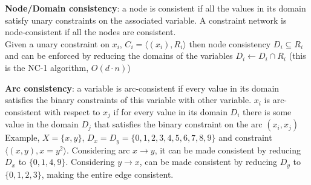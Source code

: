 \documentclass[10pt]{report}
\begin{document}
\begin{list}{}{} 
	\item \textbf{Node/Domain consistency}: a node is consistent if all the values in its domain satisfy unary constraints on the associated variable. A constraint network is node-consistent if all the nodes are consistent.\\
	Given a unary constraint on $x_i$, $C_i = \langle(x_i), R_i\rangle$ then node consistency $D_i \subseteq R_i$ and can be enforced by reducing the domains of the variables $D_i \leftarrow D_i \cap R_i$ (this is the NC-1 algorithm, $O(d\cdot n)$)
	\item \textbf{Arc consistency}: a variable is arc-consistent if every value in its domain satisfies the binary constraints of this variable with other variable. $x_i$ is arc-consistent with respect to $x_j$ if for every value in its domain $D_i$ there is some value in the domain $D_j$ that satisfies the binary constraint on the arc $(x_i, x_j)$\\
	Example, $X = \{x, y\}$, $D_x = D_y = \{0,1,2,3,4,5,6,7,8,9\}$ and constraint $\langle(x,y), x=y^2\rangle$. Considering arc $x \rightarrow y$, it can be made consistent by reducing $D_x$ to $\{0,1,4,9\}$. Considering $y \rightarrow x$, can be made consistent by reducing $D_y$ to $\{0,1,2,3\}$, making the entire edge consistent.
\end{list}
\end{document}
